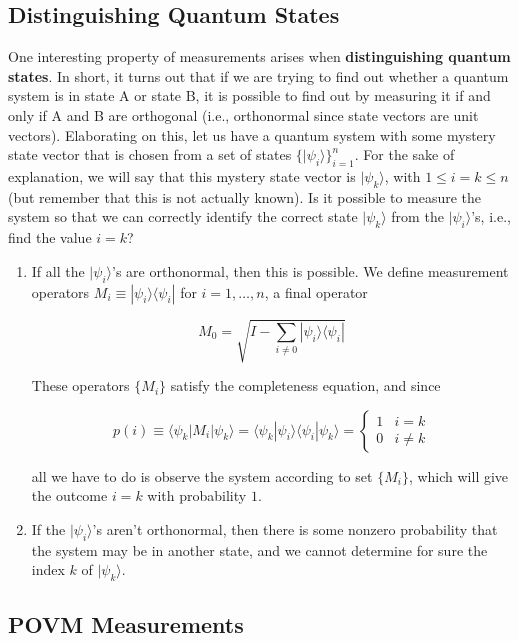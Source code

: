\documentclass{article}
\theoremstyle{definition}
\begin{document}
  \subsection{Distinguishing Quantum States}

    One interesting property of measurements arises when \textbf{distinguishing quantum states}. In short, it turns out that if we are trying to find out whether a quantum system is in state A or state B, it is possible to find out by measuring it if and only if A and B are orthogonal (i.e., orthonormal since state vectors are unit vectors). Elaborating on this, let us have a quantum system with some mystery state vector that is chosen from a set of states $\{|\psi_i \rangle \}_{i=1}^n$. For the sake of explanation, we will say that this mystery state vector is $|\psi_k \rangle$, with $1 \leq i = k \leq n$ (but remember that this is not actually known). Is it possible to measure the system so that we can correctly identify the correct state $|\psi_k \rangle$ from the $|\psi_i\rangle$'s, i.e., find the value $i=k$?

    \begin{enumerate}
      \item If all the $|\psi_i \rangle$'s are orthonormal, then this is possible. We define measurement operators $M_i \equiv |\psi_i \rangle \langle \psi_i |$ for $i = 1, \ldots, n$, a final operator

        \[M_0 = \sqrt{I - \sum_{i\neq 0} |\psi_i \rangle \langle \psi_i |}\]

      These operators $\{M_i\}$ satisfy the completeness equation, and since

        \[p(i) \equiv \langle \psi_k | M_i | \psi_k \rangle = \langle \psi_k | \psi_i \rangle \langle \psi_i | \psi_k \rangle = \begin{cases} 1 & i = k \\ 0 & i \neq k \end{cases}\]

      all we have to do is observe the system according to set $\{M_i\}$, which will give the outcome $i=k$ with probability $1$.

      \item If the $|\psi_i\rangle$'s aren't orthonormal, then there is some nonzero probability that the system may be in another state, and we cannot determine for sure the index $k$ of $|\psi_k \rangle$.
    \end{enumerate}

  \subsection{POVM Measurements}
\end{document}
